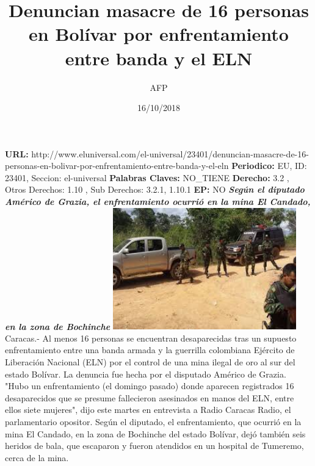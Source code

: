 \documentclass{article}%
\title{\textbf{Denuncian masacre de 16 personas en Bolívar por enfrentamiento entre banda y el ELN}}%
\author{AFP}%
\date{16/10/2018}%
\begin{document}
%
\normalsize%
\maketitle%
\textbf{URL: }%
http://www.eluniversal.com/el{-}universal/23401/denuncian{-}masacre{-}de{-}16{-}personas{-}en{-}bolivar{-}por{-}enfrentamiento{-}entre{-}banda{-}y{-}el{-}eln\newline%
%
\textbf{Periodico: }%
EU, %
ID: %
23401, %
Seccion: %
el{-}universal\newline%
%
\textbf{Palabras Claves: }%
NO\_TIENE\newline%
%
\textbf{Derecho: }%
3.2%
, Otros Derechos: %
1.10%
, Sub Derechos: %
3.2.1, 1.10.1%
\newline%
%
\textbf{EP: }%
NO\newline%
\newline%
%
\textbf{\textit{Según el diputado Américo de Grazia, el enfrentamiento ocurrió en la mina El Candado, en la zona de Bochinche}}%
\newline%
\newline%
%
\includegraphics[width=300px]{72.jpg}%
\newline%
%
Caracas.{-} Al menos 16 personas se encuentran desaparecidas tras un supuesto enfrentamiento entre una banda armada y la guerrilla colombiana Ejército de Liberación Nacional (ELN) por el control de una mina ilegal de oro al sur del estado Bolívar.%
\newline%
%
La denuncia fue hecha por el disputado Américo de Grazia.  "Hubo un enfrentamiento (el domingo pasado) donde aparecen registrados 16 desaparecidos que se presume fallecieron asesinados en manos del ELN, entre ellos siete mujeres", dijo este martes en entrevista a Radio Caracas Radio, el parlamentario opositor.%
\newline%
%
Según el diputado, el enfrentamiento, que ocurrió en la mina El Candado, en la zona de Bochinche del estado Bolívar, dejó también seis heridos de bala, que escaparon y fueron atendidos en un hospital de Tumeremo, cerca de la mina.%
\end{document}
